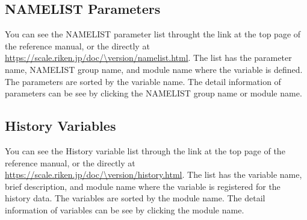 \subsection{NAMELIST Parameters}
You can see the NAMELIST parameter list throught the link at the top page of the reference manual, or the directly at \url{https://scale.riken.jp/doc/\version/namelist.html}.
The list has the parameter name, NAMELIST group name, and module name where the variable is defined.
The parameters are sorted by the variable name.
The detail information of parameters can be see by clicking the NAMELIST group name or module name.


\subsection{History Variables}
You can see the History variable list through the link at the top page of the reference manual, or the directly at \url{https://scale.riken.jp/doc/\version/history.html}.
The list has the variable name, brief description, and module name where the variable is registered for the history data.
The variables are sorted by the module name.
The detail information of variables can be see by clicking the module name.
